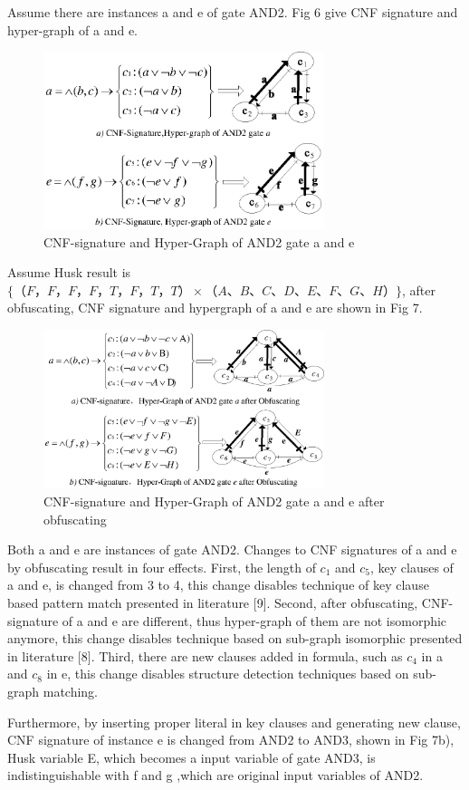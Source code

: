 \documentclass[runningheads,a4paper]{llncs}
\begin{document}
\setlength{\parindent}{2em} 
Assume there are instances a and e of gate AND2. Fig 6 give CNF signature and hyper-graph of a and e.
\begin{figure}
\centering
\includegraphics[width=8.2cm]{a6}
\caption{CNF-signature and Hyper-Graph of AND2 gate a and e}
\end{figure}
Assume Husk result is $\{（F，F，F，F，T，F，T，T）\times（A、B、C、D、E、F、G、H）\}$, after obfuscating, CNF signature and hypergraph of a and e are shown in Fig 7.
\begin{figure}
\centering
\includegraphics[width=8.2cm]{a7}
\caption{CNF-signature and Hyper-Graph of AND2 gate a and e after obfuscating}
\end{figure}
Both a and e are instances of gate AND2. Changes to CNF signatures of a and e by obfuscating result in four effects.
First, the length of $c_1$ and $c_5$, key clauses of a and e, is changed from 3 to 4, this change disables technique of key clause based pattern match presented in literature [9].
Second, after obfuscating, CNF-signature of a and e are different, thus hyper-graph of them are not isomorphic anymore, 
this change disables technique based on sub-graph isomorphic presented in literature [8].
Third, there are new clauses added in formula, such as $c_4$ in a and $c_8$ in e, this change disables structure detection techniques based on sub-graph matching. 

Furthermore, by inserting proper literal in key clauses and generating new clause, CNF signature of instance e is changed from AND2 to AND3, shown in Fig 7b),
Husk variable E, which becomes a input variable of gate AND3, is indistinguishable with f and g ,which are original input variables of AND2.
\end{document}
